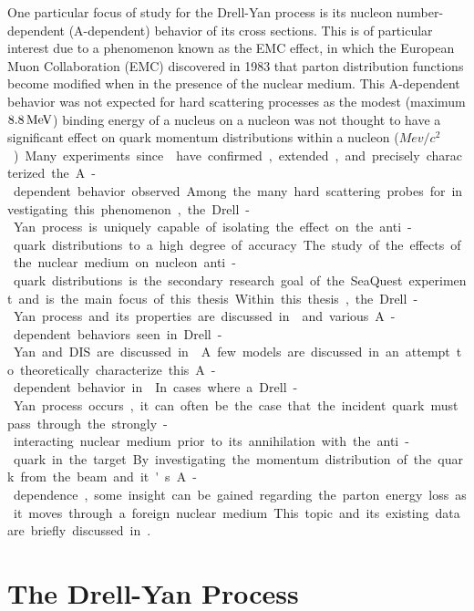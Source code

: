 One particular focus of study for the Drell-Yan process is its nucleon number-dependent (A-dependent) behavior of its cross sections. This is of particular interest due to a phenomenon known as the EMC effect, in which the European Muon Collaboration (EMC) discovered in 1983 that parton distribution functions become modified when in the presence of the nuclear medium. This A-dependent behavior was not expected for hard scattering processes as the modest (maximum $\unit[8.8]{MeV}$) binding energy of a nucleus on a nucleon was not thought to have a significant effect on quark momentum distributions within a nucleon (\unit[938]{$Mev/c^2$}). Many experiments since\CN have confirmed, extended, and precisely characterized the A-dependent behavior observed. Among the many hard scattering probes for investigating this phenomenon, the Drell-Yan process is uniquely capable of isolating the effect on the anti-quark distributions to a high degree of accuracy. The study of the effects of the nuclear medium on nucleon anti-quark distributions is the secondary research goal of the SeaQuest experiment and is the main focus of this thesis.

Within this thesis, the Drell-Yan process and its properties are discussed in  and various A-dependent behaviors seen in Drell-Yan and DIS are discussed in . A few models are discussed in an attempt to theoretically characterize this A-dependent behavior in .

In cases where a Drell-Yan process occurs, it can often be the case that the incident quark must pass through the strongly-interacting nuclear medium prior to its annihilation with the anti-quark in the target. By investigating the momentum distribution of the quark from the beam and it's A-dependence, some insight can be gained regarding the parton energy loss as it moves through a foreign nuclear medium. This topic and its existing data are briefly discussed in .

\section{The Drell-Yan Process}


